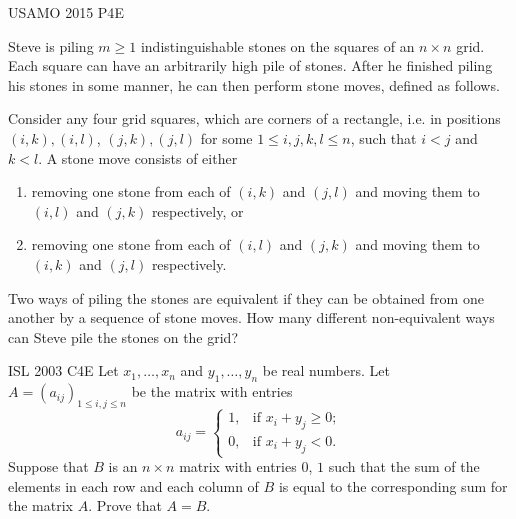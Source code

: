


{USAMO 2015 P4}{E}{
    \label{problem:constructive_algo_24}\label{problem:invariant_rules_of_thumb_12}

    Steve is piling $m\geq 1$ indistinguishable stones on the squares
    of an $n\times n$ grid. Each square can have an arbitrarily high pile of
    stones. After he finished piling his stones in some manner, he can then
    perform stone moves, defined as follows. 

    Consider any four grid squares, which are corners of a rectangle, i.e. in
    positions $(i, k), (i, l)$, $(j, k), (j, l)$ for some $1\leq i, j, k, l\leq
    n$, such that $i<j$ and $k<l$. A stone move consists of either 

    \begin{enumerate}[itemsep=0pt, left=0pt, label=$\square$]
        \item removing one stone from each of $(i, k)$ and $(j, l)$ and moving
            them to $(i, l)$ and $(j, k)$ respectively, or
        \item removing one stone from each of $(i, l)$ and $(j, k)$ and moving
            them to $(i, k)$ and $(j, l)$ respectively.
    \end{enumerate}
    Two ways of piling the stones are equivalent if they can be obtained from
    one another by a sequence of stone moves. How many different
    non-equivalent ways can Steve pile the stones on the grid?
}



{ISL 2003 C4}{E}{
    Let $x_1,\ldots, x_n$ and $y_1,\ldots, y_n$ be real numbers. Let $A =
    (a_{ij})_{1\leq i,j\leq n}$ be the matrix with entries 
    \[a_{ij} = \begin{cases}1,&\text{if }x_i + y_j\geq 0;\\0,&\text{if }x_i +
    y_j < 0.\end{cases}\]
    Suppose that $B$ is an $n\times n$ matrix with entries $0$, $1$
    such that the sum of the elements in each row and each column of $B$ is equal
    to the corresponding sum for the matrix $A$. Prove that
    $A=B$.
}\label{problem:constructive_algo_25}

